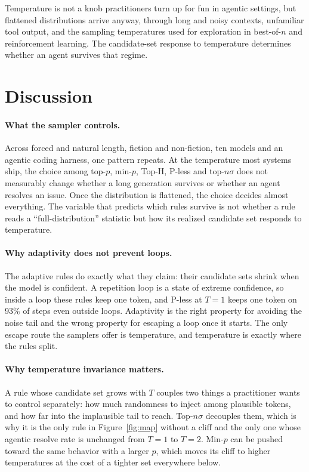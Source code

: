 \documentclass{article}
\newcommand{\pless}{P-less}
\begin{document}
Temperature is not a knob practitioners turn up for fun in agentic settings, but flattened distributions arrive anyway, through long and noisy contexts, unfamiliar tool output, and the sampling temperatures used for exploration in best-of-$n$ and reinforcement learning. The candidate-set response to temperature determines whether an agent survives that regime.


\section{Discussion}
\label{sec:discussion}

\paragraph{What the sampler controls.}
Across forced and natural length, fiction and non-fiction, ten models and an agentic coding harness, one pattern repeats. At the temperature most systems ship, the choice among top-$p$, min-$p$, Top-H, \pless{} and top-$n\sigma$ does not measurably change whether a long generation survives or whether an agent resolves an issue. Once the distribution is flattened, the choice decides almost everything. The variable that predicts which rules survive is not whether a rule reads a ``full-distribution'' statistic but how its realized candidate set responds to temperature.

\paragraph{Why adaptivity does not prevent loops.}
The adaptive rules do exactly what they claim: their candidate sets shrink when the model is confident. A repetition loop is a state of extreme confidence, so inside a loop these rules keep one token, and \pless{} at $T{=}1$ keeps one token on 93\% of steps even outside loops. Adaptivity is the right property for avoiding the noise tail and the wrong property for escaping a loop once it starts. The only escape route the samplers offer is temperature, and temperature is exactly where the rules split.

\paragraph{Why temperature invariance matters.}
A rule whose candidate set grows with $T$ couples two things a practitioner wants to control separately: how much randomness to inject among plausible tokens, and how far into the implausible tail to reach. Top-$n\sigma$ decouples them, which is why it is the only rule in Figure~\ref{fig:map} without a cliff and the only one whose agentic resolve rate is unchanged from $T{=}1$ to $T{=}2$. Min-$p$ can be pushed toward the same behavior with a larger $p$, which moves its cliff to higher temperatures at the cost of a tighter set everywhere below.
\end{document}
